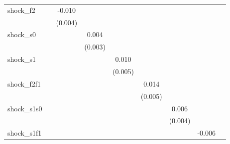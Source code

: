 {\begin{tabular}{l*{8}{c}}
\addlinespace
shock\_f2    &                     &      -0.010\sym{**} &                     &                     &                     &                     &                     &                     \\
            &                     &     (0.004)         &                     &                     &                     &                     &                     &                     \\
\addlinespace
shock\_s0    &                     &                     &       0.004         &                     &                     &                     &                     &                     \\
            &                     &                     &     (0.003)         &                     &                     &                     &                     &                     \\
\addlinespace
shock\_s1    &                     &                     &                     &       0.010\sym{**} &                     &                     &                     &                     \\
            &                     &                     &                     &     (0.005)         &                     &                     &                     &                     \\
\addlinespace
shock\_f2f1  &                     &                     &                     &                     &       0.014\sym{***}&                     &                     &                     \\
            &                     &                     &                     &                     &     (0.005)         &                     &                     &                     \\
\addlinespace
shock\_s1s0  &                     &                     &                     &                     &                     &       0.006         &                     &                     \\
            &                     &                     &                     &                     &                     &     (0.004)         &                     &                     \\
\addlinespace
shock\_s1f1  &                     &                     &                     &                     &                     &                     &      -0.006         &                     \\

\end{tabular}}
